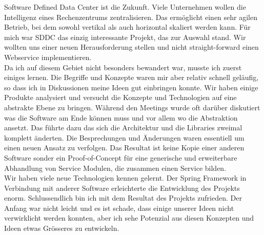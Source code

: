 Software Defined Data Center ist die Zukunft. Viele Unternehmen wollen die Intelligenz eines Rechenzentrums zentralisieren.
 Das ermöglicht einen sehr agilen Betrieb, bei dem sowohl vertikal als auch horizontal skaliert werden kann. 
 Für mich war SDDC das einzig interessante Projekt, das zur Auswahl stand. Wir wollten uns einer neuen
  Herausforderung stellen und nicht straight-forward einen Webservice implementieren.\\
\newline
Da ich auf diesem Gebiet nicht besonders bewandert war, musste ich zuerst einiges lernen. Die Begriffe und Konzepte waren mir aber relativ schnell geläufig, so dass ich in Diskussionen meine Ideen gut einbringen konnte. Wir haben einige Produkte analysiert und versucht die Konzepte und Technologien auf eine abstrakte Ebene zu bringen. Während den Meetings wurde oft darüber diskutiert was die Software am Ende können muss und vor allem wo die Abstraktion ansetzt. Das führte dazu das sich die Architektur und die Libraries zweimal komplett änderten. Die Besprechungen und Änderungen waren essentiell um einen neuen Ansatz zu verfolgen. Das Resultat ist keine Kopie einer anderen Software sonder ein Proof-of-Concept für eine generische und erweiterbare Abhandlung von Service Modulen, die zusammen einen Service bilden.\\
\newline
Wir haben viele neue Technologien kennen gelernt. Der Spring Framework in Verbindung mit anderer Software erleichterte die Entwicklung des Projekts enorm. Schlussendlich bin ich mit dem Resultat des Projekts zufrieden. Der Anfang war nicht leicht und es ist schade, dass einige unserer Ideen nicht verwirklicht werden konnten, aber ich sehe Potenzial aus diesen Konzepten und Ideen etwas Grösseres zu entwickeln.